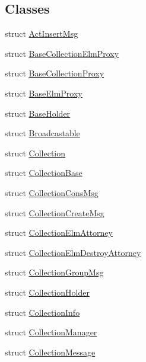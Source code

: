 \subsection*{Classes}
\begin{DoxyCompactItemize}
\item 
struct \hyperlink{structvt_1_1vrt_1_1collection_1_1_act_insert_msg}{Act\+Insert\+Msg}
\item 
struct \hyperlink{structvt_1_1vrt_1_1collection_1_1_base_collection_elm_proxy}{Base\+Collection\+Elm\+Proxy}
\item 
struct \hyperlink{structvt_1_1vrt_1_1collection_1_1_base_collection_proxy}{Base\+Collection\+Proxy}
\item 
struct \hyperlink{structvt_1_1vrt_1_1collection_1_1_base_elm_proxy}{Base\+Elm\+Proxy}
\item 
struct \hyperlink{structvt_1_1vrt_1_1collection_1_1_base_holder}{Base\+Holder}
\item 
struct \hyperlink{structvt_1_1vrt_1_1collection_1_1_broadcastable}{Broadcastable}
\item 
struct \hyperlink{structvt_1_1vrt_1_1collection_1_1_collection}{Collection}
\item 
struct \hyperlink{structvt_1_1vrt_1_1collection_1_1_collection_base}{Collection\+Base}
\item 
struct \hyperlink{structvt_1_1vrt_1_1collection_1_1_collection_cons_msg}{Collection\+Cons\+Msg}
\item 
struct \hyperlink{structvt_1_1vrt_1_1collection_1_1_collection_create_msg}{Collection\+Create\+Msg}
\item 
struct \hyperlink{structvt_1_1vrt_1_1collection_1_1_collection_elm_attorney}{Collection\+Elm\+Attorney}
\item 
struct \hyperlink{structvt_1_1vrt_1_1collection_1_1_collection_elm_destroy_attorney}{Collection\+Elm\+Destroy\+Attorney}
\item 
struct \hyperlink{structvt_1_1vrt_1_1collection_1_1_collection_group_msg}{Collection\+Group\+Msg}
\item 
struct \hyperlink{structvt_1_1vrt_1_1collection_1_1_collection_holder}{Collection\+Holder}
\item 
struct \hyperlink{structvt_1_1vrt_1_1collection_1_1_collection_info}{Collection\+Info}
\item 
struct \hyperlink{structvt_1_1vrt_1_1collection_1_1_collection_manager}{Collection\+Manager}
\item 
struct \hyperlink{structvt_1_1vrt_1_1collection_1_1_collection_message}{Collection\+Message}

\end{DoxyCompactItemize}
